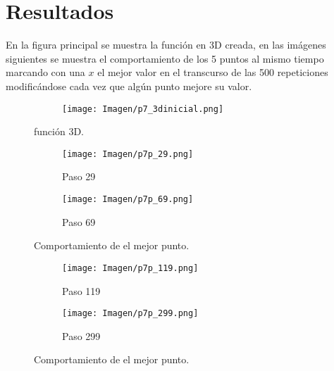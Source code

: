 \documentclass{article}
\begin{document}
\section{Resultados}
En la figura principal se muestra la función en 3D creada, en las imágenes siguientes se muestra el comportamiento de los 5 puntos al mismo tiempo marcando con una $x$ el mejor valor en el transcurso de las 500 repeticiones modificándose cada vez que algún punto mejore su valor.
\begin{figure}[H]
\centering
\begin{subfigure}[b]{1.0\linewidth}
\texttt{[image: Imagen/p7\_3dinicial.png]}
\end{subfigure}
\caption{función 3D.}
\label{fig:westminster}
\end{figure}

\begin{figure}[H]
\centering
\begin{subfigure}[Absoluto]{0.45\linewidth}
\texttt{[image: Imagen/p7p\_29.png]}
\caption{Paso 29 }
\end{subfigure}
\begin{subfigure}[Cuadrado]{0.45\linewidth}
\texttt{[image: Imagen/p7p\_69.png]}
\caption{Paso 69}
\end{subfigure}
\caption{Comportamiento de el mejor punto.}
\label{fig:westminster}
\end{figure}

\begin{figure}[H]
\centering
\begin{subfigure}[Absoluto]{0.45\linewidth}
\texttt{[image: Imagen/p7p\_119.png]}
\caption{Paso 119}
\end{subfigure}
\begin{subfigure}[Cuadrado]{0.45\linewidth}
\texttt{[image: Imagen/p7p\_299.png]}
\caption{Paso 299}
\end{subfigure}
\caption{Comportamiento de el mejor punto.}
\label{fig:westminster}
\end{figure}

\newpage
\end{document}

